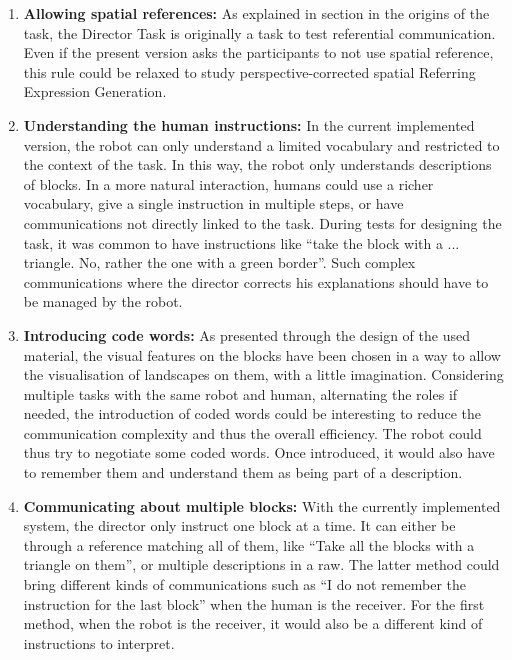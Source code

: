 \begin{enumerate}
\item \textbf{Allowing spatial references:} As explained in section in the origins of the task, the Director Task is originally a task to test referential communication. Even if the present version asks the participants to not use spatial reference, this rule could be relaxed to study perspective-corrected spatial Referring Expression Generation.\label{chal:spatial_ref}

\item \textbf{Understanding the human instructions:} In the current implemented version, the robot can only understand a limited vocabulary and restricted to the context of the task. In this way, the robot only understands descriptions of blocks. In a more natural interaction, humans could use a richer vocabulary, give a single instruction in multiple steps, or have communications not directly linked to the task. During tests for designing the task, it was common to have instructions like ``take the block with a ... triangle. No, rather the one with a green border''. Such complex communications where the director corrects his explanations should have to be managed by the robot.\label{chal:understand}

\item \textbf{Introducing code words:} As presented through the design of the used material, the visual features on the blocks have been chosen in a way to allow the visualisation of landscapes on them, with a little imagination. Considering multiple tasks with the same robot and human, alternating the roles if needed, the introduction of coded words could be interesting to reduce the communication complexity and thus the overall efficiency. The robot could thus try to negotiate some coded words. Once introduced, it would also have to remember them and understand them as being part of a description. \label{chal:words}

\item \textbf{Communicating about multiple blocks:} With the currently implemented system, the director only instruct one block at a time. It can either be through a reference matching all of them, like ``Take all the blocks with a triangle on them'', or multiple descriptions in a raw. The latter method could bring different kinds of communications such as ``I do not remember the instruction for the last block'' when the human is the receiver. For the first method, when the robot is the receiver, it would also be a different kind of instructions to interpret.\label{chal:multi}
\end{enumerate}

